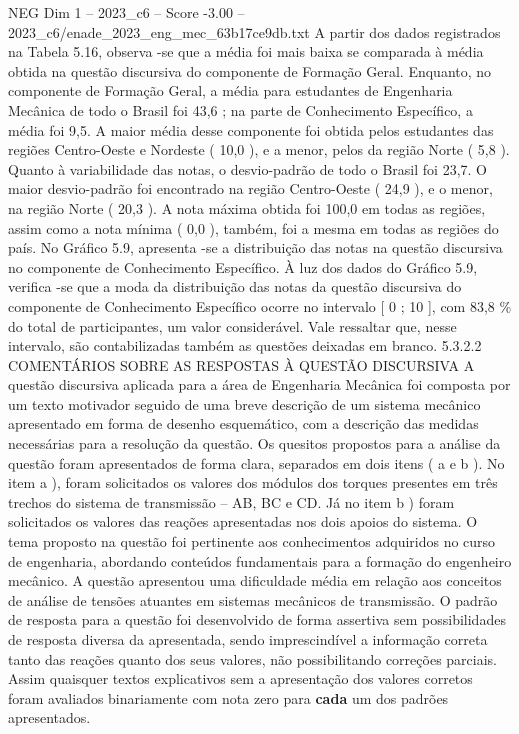 \begin{textsample}{NEG Dim 1 – 2023\_c6 – Score -3.00 – 2023\_c6/enade\_2023\_eng\_mec\_63b17ce9db.txt}
A partir dos dados registrados na Tabela 5.16, observa -se que a média foi mais baixa se comparada à média obtida na questão discursiva do componente de Formação Geral.
Enquanto, no componente de Formação Geral, a média para estudantes de Engenharia Mecânica de todo o Brasil foi 43,6 ; na parte de Conhecimento Específico, a média foi 9,5.
A maior média desse componente foi obtida pelos estudantes das regiões Centro-Oeste e Nordeste ( 10,0 ), e a menor, pelos da região Norte ( 5,8 ).
Quanto à variabilidade das notas, o desvio-padrão de todo o Brasil foi 23,7.
O maior desvio-padrão foi encontrado na região Centro-Oeste ( 24,9 ), e o menor, na região Norte ( 20,3 ).
A nota máxima obtida foi 100,0 em todas as regiões, assim como a nota mínima ( 0,0 ), também, foi a mesma em todas as regiões do país.
No Gráfico 5.9, apresenta -se a distribuição das notas na questão discursiva no componente de Conhecimento Específico.
À luz dos dados do Gráfico 5.9, verifica -se que a moda da distribuição das notas da questão discursiva do componente de Conhecimento Específico ocorre no intervalo [ 0 ; 10 ], com 83,8 \% do total de participantes, um valor considerável.
Vale ressaltar que, nesse intervalo, são contabilizadas também as questões deixadas em branco. 5.3.2.2 COMENTÁRIOS SOBRE AS RESPOSTAS À QUESTÃO DISCURSIVA A questão discursiva aplicada para a área de Engenharia Mecânica foi composta por um texto motivador seguido de uma breve descrição de um sistema mecânico apresentado em forma de desenho esquemático, com a descrição das medidas necessárias para a resolução da questão.
Os quesitos propostos para a análise da questão foram apresentados de forma clara, separados em dois itens ( a e b ).
No item a ), foram solicitados os valores dos módulos dos torques presentes em três trechos do sistema de transmissão – AB, BC e CD.
Já no item b ) foram solicitados os valores das reações apresentadas nos dois apoios do sistema.
O tema proposto na questão foi pertinente aos conhecimentos adquiridos no curso de engenharia, abordando conteúdos fundamentais para a formação do engenheiro mecânico.
A questão apresentou uma dificuldade média em relação aos conceitos de análise de tensões atuantes em sistemas mecânicos de transmissão.
O padrão de resposta para a questão foi desenvolvido de forma assertiva sem possibilidades de resposta diversa da apresentada, sendo imprescindível a informação correta tanto das reações quanto dos seus valores, não possibilitando correções parciais.
Assim quaisquer textos explicativos sem a apresentação dos valores corretos foram avaliados binariamente com nota zero para \textbf{cada} um dos padrões apresentados.

\end{textsample}
